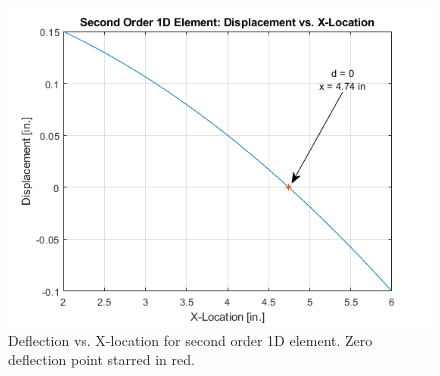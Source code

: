\documentclass[../main.tex]{subfiles}
\begin{document}
\begin{figure}[h!]
    \centering
    \includegraphics[scale=1]{../../images/problem_2/deflection_plot.png}
    \caption{Deflection vs. X-location for second order 1D element. Zero deflection point starred in red.}
    \label{deflection_plot}
\end{figure}
\end{document}
